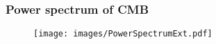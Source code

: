 \begin{frame}
\frametitle{Power spectrum of CMB}

\begin{figure}
	\texttt{[image: images/PowerSpectrumExt.pdf]}
\end{figure}

\end{frame}